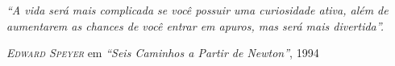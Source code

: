 
\begin{epigrafe} %

 
\textit{\large``A vida será mais complicada se você possuir uma curiosidade ativa, além de aumentarem as chances de você entrar em apuros, mas será mais divertida''.}

\vspace{1cm}

\hspace{4cm} \emph{\textsc{Edward Speyer}} \hspace{4cm} em \textsl{``Seis Caminhos a Partir de Newton''}, 1994

\end{epigrafe}